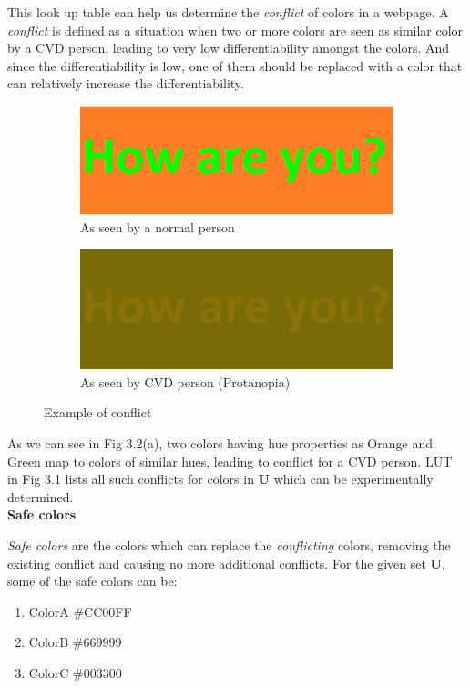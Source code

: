 This look up table can help us determine the \textit{conflict} of colors in a webpage. A \textit{conflict} is defined as a situation when two or more colors are seen as similar color by a CVD person, leading to very low differentiability amongst the colors. And since the differentiability is low, one of them should be replaced with a color that can relatively increase the differentiability.

\begin{figure}[!htb]
\centering
\begin{subfigure}{.5\textwidth}
  \centering
  \includegraphics[width=.5\linewidth]{hru1.png}
  \caption{As seen by a normal person}
  \label{fig:sub1}
\end{subfigure}%
\begin{subfigure}{.5\textwidth}
  \centering
  \includegraphics[width=.5\linewidth]{hru2.png}
  \caption{As seen by CVD person (Protanopia)}
  \label{fig:sub2}
\end{subfigure}
\caption{Example of conflict}
\label{fig:test}
\end{figure}

As we can see in Fig 3.2(a), two colors having hue properties as Orange and Green map to colors of similar hues, leading to conflict for a CVD person. LUT in Fig 3.1 lists all such conflicts for colors in \textbf{U} which can be experimentally determined.   \\ 



\textbf{Safe colors}


\textit{Safe colors} are the colors which can replace the \textit{conflicting} colors, removing the existing conflict and causing no more additional conflicts. For the given set \textbf{U}, some of the safe colors can be:

\begin{enumerate}
    \item ColorA \#CC00FF
	\item ColorB \#669999
	\item ColorC \#003300
\end{enumerate} 


